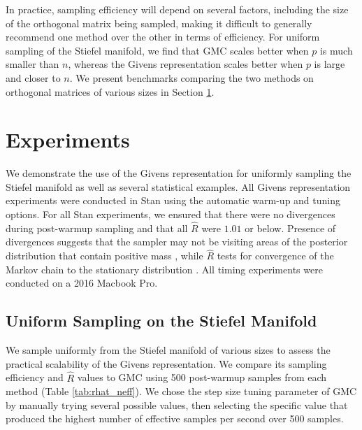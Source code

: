 \documentclass[ba]{imsart}
\numberwithin{equation}{section}
\theoremstyle{plain}
\begin{document}
\noindent In practice, sampling efficiency will depend on several factors, including the size of the orthogonal matrix being sampled, making it difficult to generally recommend one method over the other in terms of efficiency. For uniform sampling of the Stiefel manifold, we find that GMC scales better when $p$ is much smaller than $n$, whereas the Givens representation scales better when $p$ is large and closer to $n$. We present benchmarks comparing the two methods on orthogonal matrices of various sizes in Section \ref{examples}.

\section{Experiments} \label{examples}
We demonstrate the use of the Givens representation for uniformly sampling the Stiefel manifold as well as several statistical examples. All Givens representation experiments were conducted in Stan using the automatic warm-up and tuning options. For all Stan experiments, we ensured that there were no divergences during post-warmup sampling and that all $\hat{R}$ were $1.01$ or below. Presence of divergences suggests that the sampler may not be visiting areas of the posterior distribution that contain positive mass \citep{betancourt2015hamiltonian}, while $\hat{R}$ tests for convergence of the Markov chain to the stationary distribution \citep{gelman1992inference}. All timing experiments were conducted on a 2016 Macbook Pro.

\subsection{Uniform Sampling on the Stiefel Manifold} \label{scaling_examples}
We sample uniformly from the Stiefel manifold of various sizes to assess the practical scalability of the Givens representation. We compare its sampling efficiency and $\hat{R}$ values to GMC using 500 post-warmup samples from each method (Table \ref{tab:rhat_neff}).  We chose the step size tuning parameter of GMC by manually trying several possible values, then selecting the specific value that produced the highest number of effective samples per second over 500 samples.
\end{document}
